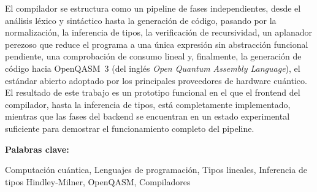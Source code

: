 \documentclass[a4paper,12pt,oneside]{scrbook}
\numberwithin{equation}{chapter}
\newenvironment{abstract}[1][\abstractname]{
    \cleardoublepageusingstyle{empty}
    \thispagestyle{empty}
    \begin{center}\textbf{#1}\end{center}
    \begin{itshape}\par\noindent%
}
{\end{itshape}}
\newenvironment{keywords}[1][Keywords]
{\vspace{7pt}\par\noindent\textup{\textbf{#1: }}\begin{upshape}}
{\end{upshape}}
\begin{document}
\begin{abstract}
El compilador se estructura como un pipeline de fases independientes, desde el análisis léxico y sintáctico hasta la generación de código, pasando por la normalización, la inferencia de tipos, la verificación de recursividad, un aplanador perezoso que reduce el programa a una única expresión sin abstracción funcional pendiente, una comprobación de consumo lineal y, finalmente, la generación de código hacia OpenQASM~3 (del inglés \textit{Open Quantum Assembly Language}), el estándar abierto adoptado por los principales proveedores de hardware cuántico. El resultado de este trabajo es un prototipo funcional en el que el frontend del compilador, hasta la inferencia de tipos, está completamente implementado, mientras que las fases del backend se encuentran en un estado experimental suficiente para demostrar el funcionamiento completo del pipeline.

\begin{keywords}[Palabras clave]
Computación cuántica, Lenguajes de programación, Tipos lineales, Inferencia de tipos Hindley-Milner, OpenQASM, Compiladores
\end{keywords}
\end{abstract}

\thispagestyle{empty}
\end{document}
